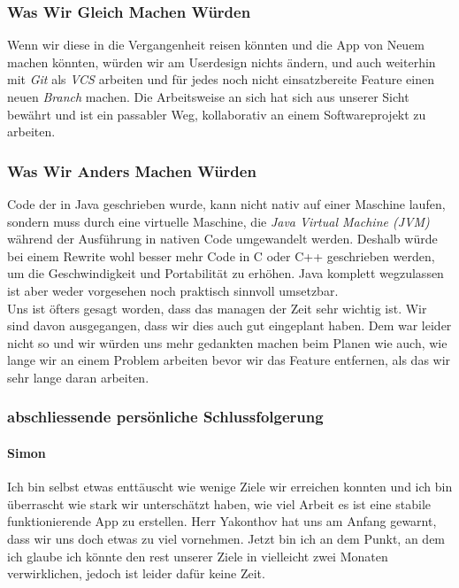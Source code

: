 \documentclass[a4paper,11pt]{article}
\begin{document}
\subsubsection{Was Wir Gleich Machen Würden}
Wenn wir diese in die Vergangenheit reisen könnten und die App von Neuem machen könnten, würden wir am Userdesign nichts ändern, und auch weiterhin mit \textit{Git} als \textit{VCS} arbeiten und für jedes noch nicht einsatzbereite Feature einen neuen \textit{Branch} machen. Die Arbeitsweise an sich hat sich aus unserer Sicht bewährt und ist ein passabler Weg, kollaborativ an einem Softwareprojekt zu arbeiten.
\subsubsection{Was Wir Anders Machen Würden}

Code der in Java geschrieben wurde, kann nicht nativ auf einer Maschine laufen, sondern muss durch eine virtuelle Maschine, die \textit{Java Virtual Machine (JVM)} während der Ausführung in nativen Code umgewandelt werden. Deshalb würde bei einem Rewrite wohl besser mehr Code in C oder C++ geschrieben werden, um die Geschwindigkeit und Portabilität zu erhöhen. Java komplett wegzulassen ist aber weder vorgesehen noch praktisch sinnvoll umsetzbar. \\

Uns ist öfters gesagt worden, dass das managen der Zeit sehr wichtig ist. Wir sind davon ausgegangen, dass wir dies auch gut eingeplant haben. Dem war leider nicht so und wir 
würden uns mehr gedankten machen beim Planen wie auch, wie lange wir an einem Problem arbeiten bevor wir das Feature entfernen, als das wir sehr lange daran arbeiten. 


\subsubsection{abschliessende persönliche Schlussfolgerung}
\paragraph{Simon}
Ich bin selbst etwas enttäuscht wie wenige Ziele wir erreichen konnten und ich bin überrascht wie stark wir unterschätzt haben, wie 
viel Arbeit es ist eine stabile funktionierende App zu erstellen. Herr Yakonthov hat uns am Anfang gewarnt, dass wir uns doch etwas zu viel vornehmen. Jetzt bin ich an dem Punkt, an dem 
ich glaube ich könnte den rest unserer Ziele in vielleicht zwei Monaten verwirklichen, jedoch ist leider dafür keine Zeit.\\
\end{document}
